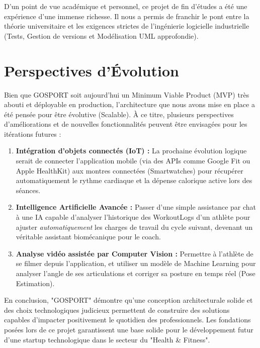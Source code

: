 D'un point de vue académique et personnel, ce projet de fin d'études a été une expérience d'une immense richesse. Il nous a permis de franchir le pont entre la théorie universitaire et les exigences strictes de l'ingénierie logicielle industrielle (Tests, Gestion de versions et Modélisation UML approfondie).

\section*{Perspectives d'Évolution}
Bien que GOSPORT soit aujourd'hui un Minimum Viable Product (MVP) très abouti et déployable en production, l'architecture que nous avons mise en place a été pensée pour être évolutive (Scalable). À ce titre, plusieurs perspectives d'améliorations et de nouvelles fonctionnalités peuvent être envisagées pour les itérations futures :

\begin{enumerate}
    \item \textbf{Intégration d'objets connectés (IoT) :} La prochaine évolution logique serait de connecter l'application mobile (via des APIs comme Google Fit ou Apple HealthKit) aux montres connectées (Smartwatches) pour récupérer automatiquement le rythme cardiaque et la dépense calorique active lors des séances.
    \item \textbf{Intelligence Artificielle Avancée :} Passer d'une simple assistance par chat à une IA capable d'analyser l'historique des WorkoutLogs d'un athlète pour ajuster \textit{automatiquement} les charges de travail du cycle suivant, devenant un véritable assistant biomécanique pour le coach.
    \item \textbf{Analyse vidéo assistée par Computer Vision :} Permettre à l'athlète de se filmer depuis l'application, et utiliser un modèle de Machine Learning pour analyser l'angle de ses articulations et corriger sa posture en temps réel (Pose Estimation).
\end{enumerate}

En conclusion, "GOSPORT" démontre qu'une conception architecturale solide et des choix technologiques judicieux permettent de construire des solutions capables d'impacter positivement le quotidien des professionnels. Les fondations posées lors de ce projet garantissent une base solide pour le développement futur d'une startup technologique dans le secteur du "Health \& Fitness".
